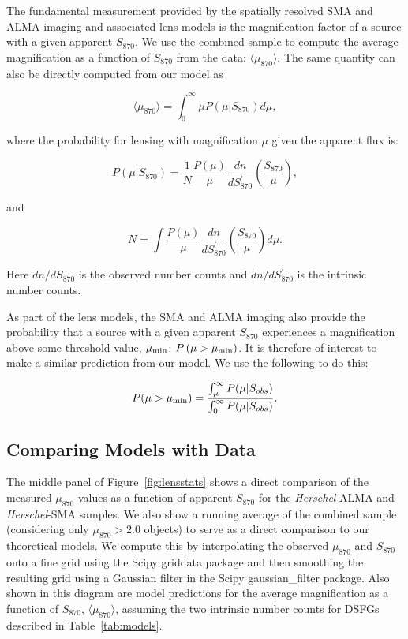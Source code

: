 \documentclass[iop]{emulateapj}
\begin{document}


The fundamental measurement provided by the spatially resolved SMA and ALMA
imaging and associated lens models is the magnification factor of a source with
a given apparent $S_{870}$.  We use the combined sample to compute the average
magnification as a function of $S_{870}$ from the data:
$\langle\mu_{870}\rangle$.  The same quantity can also be directly computed
from our model as 

\begin{equation}
    \langle\mu_{870}\rangle = \int_0^\infty \mu P(\mu|S_{870})  d\mu,
 \end{equation}

\noindent where the probability for lensing with magnification $\mu$ given the
apparent flux is:

\begin{equation}
    P(\mu|S_{870}) = \frac{1}{N} \frac{P(\mu)}{\mu} \frac{dn}{dS_{870}^\prime}
\left(\frac{S_{870}}{\mu}\right),
\end{equation} 

\noindent and 

\begin{equation}
    N = \int \frac{P(\mu)}{\mu} \frac{dn}{dS_{870}^\prime}
    \left(\frac{S_{870}}{\mu}\right)d\mu.
\end{equation}

\noindent Here $ dn/dS_{870}$ is the observed number counts and
$dn/dS_{870}^\prime$ is the intrinsic number counts.

As part of the lens models, the SMA and ALMA imaging also provide the
probability that a source with a given apparent $S_{870}$ experiences a
magnification above some threshold value, $\mu_{\rm min}$: $P\,(\mu > \mu_{\rm
min})$.  It is therefore of interest to make a similar prediction from our
model.  We use the following to do this:

\begin{equation}
    P(\mu>\mu_{\rm min}) = \frac{\int_\mu^\infty P(\mu|S_{obs})}{\int_0^\infty
    P(\mu|S_{obs})}.
\end{equation}

\subsection{Comparing Models with Data}

The middle panel of Figure~\ref{fig:lensstats} shows a direct comparison of the
measured $\mu_{870}$ values as a function of apparent $S_{870}$ for the {\it
Herschel}-ALMA and {\it Herschel}-SMA samples.  We also show a running average
of the combined sample (considering only $\mu_{870} > 2.0$ objects) to serve as
a direct comparison to our theoretical models.  We compute this by
interpolating the observed $\mu_{870}$ and $S_{870}$ onto a fine grid using the
{\sc Scipy} {\sc griddata} package and then smoothing the resulting grid using
a Gaussian filter in the Scipy {\sc gaussian\_filter} package.
Also shown in this diagram are model predictions for the average magnification
as a function of $S_{870}$, $\langle\mu_{870}\rangle$, assuming the two
intrinsic number counts for DSFGs described in Table~\ref{tab:models}.  
\end{document}
